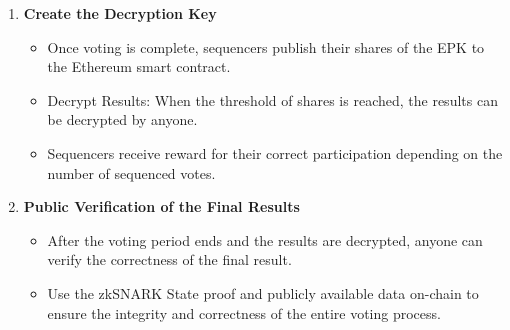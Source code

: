 \begin{enumerate}
	\item \textbf{Create the Decryption Key}

			\begin{itemize}
				\item Once voting is complete, sequencers publish their shares of the EPK to the Ethereum smart contract.
				\item Decrypt Results: When the threshold of shares is reached, the results can be decrypted by anyone.
				\item Sequencers receive reward for their correct participation depending on the number of sequenced votes.
			\end{itemize}
	
	\item \textbf{Public Verification of the Final Results}
			\begin{itemize}
				\item After the voting period ends and the results are decrypted, anyone can verify the correctness of the final result.
				\item Use the zkSNARK State proof and publicly available data on-chain to ensure the integrity and correctness of the entire voting process.
			\end{itemize} 
\end{enumerate}

\begin{figure}[H]
	\centering
\end{figure}
